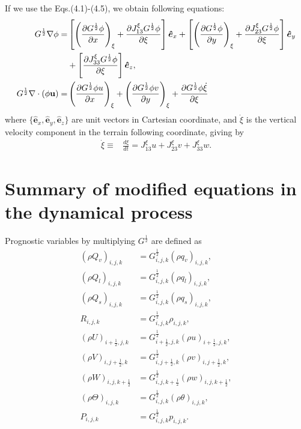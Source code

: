 If we use the Eqs.(4.1)-(4.5), we obtain following equations:
\begin{align}
 G^{\frac{1}{2}}  \nabla \phi =& 
     \left[  \left(\frac{\partial G^{\frac{1}{2}} \phi}{\partial x}\right)_{\xi}
         + \frac{\partial J^{\xi}_{13} G^{\frac{1}{2}} \phi}{\partial \xi} \right] \bm{\hat{e}}_x
    + \left[  \left(\frac{\partial G^{\frac{1}{2}} \phi}{\partial y}\right)_{\xi}
         + \frac{\partial J^{\xi}_{23} G^{\frac{1}{2}} \phi}{\partial \xi} \right] \bm{\hat{e}}_y  \nonumber \\
   &+ \left[ \frac{\partial J^{\xi}_{33}  G^{\frac{1}{2}} \phi}{\partial \xi} \right] \bm{\hat{e}}_z, \\
 G^{\frac{1}{2}} \nabla \cdot (\phi \bf u) =&  
       \left( \frac{\partial G^{\frac{1}{2}} \phi u}{\partial x} \right)_{\xi}
     + \left( \frac{\partial G^{\frac{1}{2}} \phi v}{\partial y} \right)_{\xi}
     + \frac{\partial G^{\frac{1}{2}} \phi \dot{\xi}}{\partial \xi}
\end{align}
where $\{\bm{\hat{e}}_x, \bm{\hat{e}}_y, \bm{\hat{e}}_z\}$ are unit vectors in Cartesian coordinate, and
$\dot{\xi}$ is the vertical velocity component in the terrain following coordinate, 
giving by
\begin{align}
 \dot{\xi} 
   \equiv& \frac{d\xi}{dt} 
   = J^{\xi}_{13} u + J^{\xi}_{23} v + J^{\xi}_{33} w. 
\end{align}

\section{Summary of modified equations in the dynamical process}

Prognostic variables by multiplying $G^{\frac{1}{2}}$ are defined as
\begin{align}
 (\rho Q_v)_{i,j,k}           &= G^{\frac{1}{2}}_{i,j,k}             (\rho q_v)_{i,j,k},        \\
 (\rho Q_l)_{i,j,k}           &= G^{\frac{1}{2}}_{i,j,k}             (\rho q_l)_{i,j,k},        \\
 (\rho Q_s)_{i,j,k}           &= G^{\frac{1}{2}}_{i,j,k}             (\rho q_s)_{i,j,k},        \\
 R_{i,j,k}                    &= G^{\frac{1}{2}}_{i,j,k}              \rho_{i,j,k},                \\
 (\rho U)_{i+\frac{1}{2},j,k} &= G^{\frac{1}{2}}_{i+\frac{1}{2},j,k} (\rho u)_{i+\frac{1}{2},j,k}, \\
 (\rho V)_{i,j+\frac{1}{2},k} &= G^{\frac{1}{2}}_{i,j+\frac{1}{2},k} (\rho v)_{i,j+\frac{1}{2},k}, \\
 (\rho W)_{i,j,k+\frac{1}{2}} &= G^{\frac{1}{2}}_{i,j,k+\frac{1}{2}} (\rho w)_{i,j,k+\frac{1}{2}}, \\
 (\rho \Theta)_{i,j,k}        &= G^{\frac{1}{2}}_{i,j,k}             (\rho \theta)_{i,j,k},        \\
 P_{i,j,k}                    &= G^{\frac{1}{2}}_{i,j,k}              p_{i,j,k}. 
\end{align}

